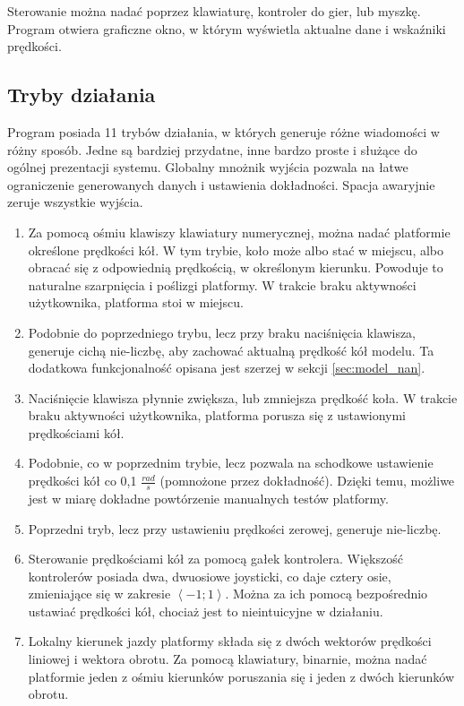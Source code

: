	Sterowanie można nadać poprzez klawiaturę, kontroler do gier, lub myszkę.
	Program otwiera graficzne okno, w którym wyświetla aktualne dane i wskaźniki prędkości.
	
	\subsection{Tryby działania}
		Program posiada 11 trybów działania, w których generuje różne wiadomości w różny sposób.
		Jedne są bardziej przydatne, inne bardzo proste i służące do ogólnej prezentacji systemu.
		Globalny mnożnik wyjścia pozwala na łatwe ograniczenie generowanych danych i ustawienia dokładności. Spacja awaryjnie zeruje wszystkie wyjścia.
		\begin{enumerate}
			\item Za pomocą ośmiu klawiszy klawiatury numerycznej, można nadać platformie określone prędkości kół.
			W tym trybie, koło może albo stać w miejscu, albo obracać się z odpowiednią prędkością, w określonym kierunku. 
			Powoduje to naturalne szarpnięcia i poślizgi platformy. W trakcie braku aktywności użytkownika, platforma stoi w miejscu.
			\item Podobnie do poprzedniego trybu, lecz przy braku naciśnięcia klawisza, generuje cichą nie-liczbę, aby zachować aktualną prędkość kół modelu.
			Ta dodatkowa funkcjonalność opisana jest szerzej w sekcji \ref{sec:model_nan}.
			\item Naciśnięcie klawisza płynnie zwiększa, lub zmniejsza prędkość koła. W trakcie braku aktywności użytkownika, platforma porusza się 
			z ustawionymi prędkościami kół.
			\item Podobnie, co w poprzednim trybie, lecz pozwala na schodkowe ustawienie prędkości kół co 0,1 $\frac{rad}{s}$ (pomnożone przez dokładność).
			Dzięki temu, możliwe jest w miarę dokładne powtórzenie manualnych testów platformy.
			\item Poprzedni tryb, lecz przy ustawieniu prędkości zerowej, generuje nie-liczbę.
			\item Sterowanie prędkościami kół za pomocą gałek kontrolera.
			Większość kontrolerów posiada dwa, dwuosiowe joysticki, co daje cztery osie, zmieniające się w zakresie $\left<-1;1\right>$.
			Można za ich pomocą bezpośrednio ustawiać prędkości kół, chociaż jest to nieintuicyjne w działaniu.
			\item Lokalny kierunek jazdy platformy składa się z dwóch wektorów prędkości liniowej i wektora obrotu. 
			Za pomocą klawiatury, binarnie, można nadać platformie jeden z ośmiu kierunków poruszania się i jeden z dwóch kierunków obrotu.

\end{enumerate}
